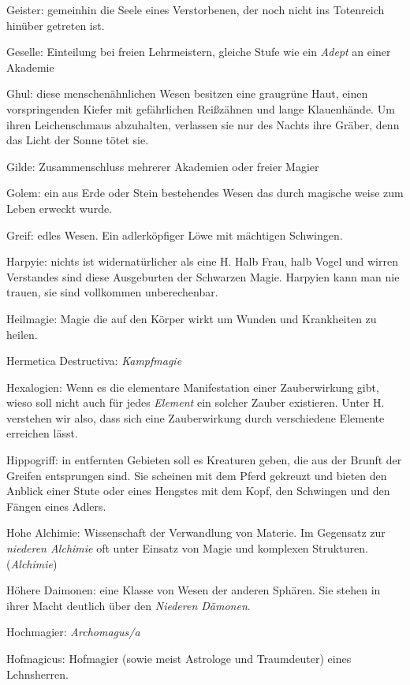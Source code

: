 \documentclass[a5paper,8pt]{book}
\begin{document}
\begin{small}
\begin{description}
 \item Geister: gemeinhin die Seele eines Verstorbenen, der noch nicht ins Totenreich hinüber getreten ist.
 \item Geselle: Einteilung bei freien Lehrmeistern, gleiche Stufe wie ein \textit{Adept} an einer Akademie
 \item Ghul: diese menschenähnlichen Wesen besitzen eine graugrüne Haut, einen vorspringenden Kiefer mit gefährlichen Reißzähnen und lange Klauenhände. Um ihren 
Leichenschmaus abzuhalten, verlassen sie nur des Nachts ihre Gräber, denn das Licht der Sonne tötet sie.
 \item Gilde: Zusammenschluss mehrerer Akademien oder freier Magier
 \item Golem: ein aus Erde oder Stein bestehendes Wesen das durch magische weise zum Leben erweckt wurde.
 \item Greif: edles Wesen. Ein adlerköpfiger Löwe mit mächtigen Schwingen.
 \item Harpyie: nichts ist widernatürlicher als eine H. Halb Frau, halb Vogel und wirren Verstandes sind diese Ausgeburten der Schwarzen Magie. Harpyien kann man nie trauen, 
sie sind vollkommen unberechenbar.
 \item Heilmagie: Magie die auf den Körper wirkt um Wunden und Krankheiten zu heilen.
 \item Hermetica Destructiva: \textit{Kampfmagie}
 \item Hexalogien: Wenn es die elementare Manifestation einer Zauberwirkung gibt, wieso soll nicht auch für jedes \textit{Element} ein solcher Zauber existieren. Unter H. 
verstehen wir also, dass sich eine Zauberwirkung durch verschiedene Elemente erreichen lässt.
 \item Hippogriff: in entfernten Gebieten soll es Kreaturen geben, die aus der Brunft der Greifen entsprungen sind. Sie scheinen mit dem Pferd gekreuzt und bieten den 
Anblick einer Stute oder eines Hengstes mit dem Kopf, den Schwingen und den Fängen eines Adlers.
 \item Hohe Alchimie: Wissenschaft der Verwandlung von Materie. Im Gegensatz zur \textit{niederen Alchimie} oft unter Einsatz von Magie und komplexen Strukturen.
(\textit{Alchimie})
 \item Höhere Daimonen: eine Klasse von Wesen der anderen Sphären. Sie stehen in ihrer Macht deutlich über den \textit{Niederen Dämonen}.
 \item Hochmagier: \textit{Archomagus/a}
 \item Hofmagicus: Hofmagier (sowie meist Astrologe und Traum­deuter) eines Lehnsherren.

\end{description}
\end{small}
\end{document}
